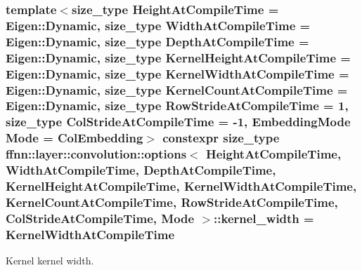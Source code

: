 \hypertarget{structffnn_1_1layer_1_1convolution_1_1options_a10296c3b7e5994a25b8c22f11b4252ca}{
\subsubsection[{kernel\-\_\-width}]{\setlength{\rightskip}{0pt plus 5cm}template$<$size\-\_\-type Height\-At\-Compile\-Time = Eigen\-::\-Dynamic, size\-\_\-type Width\-At\-Compile\-Time = Eigen\-::\-Dynamic, size\-\_\-type Depth\-At\-Compile\-Time = Eigen\-::\-Dynamic, size\-\_\-type Kernel\-Height\-At\-Compile\-Time = Eigen\-::\-Dynamic, size\-\_\-type Kernel\-Width\-At\-Compile\-Time = Eigen\-::\-Dynamic, size\-\_\-type Kernel\-Count\-At\-Compile\-Time = Eigen\-::\-Dynamic, size\-\_\-type Row\-Stride\-At\-Compile\-Time = 1, size\-\_\-type Col\-Stride\-At\-Compile\-Time = -\/1, Embedding\-Mode Mode = Col\-Embedding$>$ constexpr {\bf size\-\_\-type} {\bf ffnn\-::layer\-::convolution\-::options}$<$ Height\-At\-Compile\-Time, Width\-At\-Compile\-Time, Depth\-At\-Compile\-Time, Kernel\-Height\-At\-Compile\-Time, Kernel\-Width\-At\-Compile\-Time, Kernel\-Count\-At\-Compile\-Time, Row\-Stride\-At\-Compile\-Time, Col\-Stride\-At\-Compile\-Time, Mode $>$\-::kernel\-\_\-width = Kernel\-Width\-At\-Compile\-Time\hspace{0.3cm}{\ttfamily [static]}}}\label{structffnn_1_1layer_1_1convolution_1_1options_a10296c3b7e5994a25b8c22f11b4252ca}


Kernel kernel width. 

